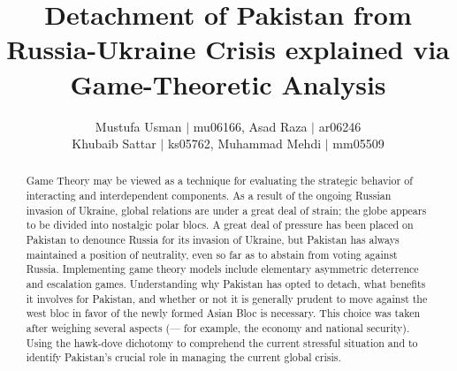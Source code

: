 \documentclass[runningheads]{llncs}
\begin{document}
%
\title{Detachment of Pakistan from Russia-Ukraine Crisis explained via Game-Theoretic Analysis}
%
%
\author{Mustufa Usman $|$ mu06166, Asad Raza $|$ ar06246 \\
Khubaib Sattar $|$ ks05762, Muhammad Mehdi $|$ mm05509}


%
\maketitle             %
%
\begin{abstract}
Game Theory may be viewed as a technique for evaluating the strategic behavior of interacting and interdependent components. As a result of the ongoing Russian invasion of Ukraine, global relations are under a great deal of strain; the globe appears to be divided into nostalgic polar blocs. A great deal of pressure has been placed on Pakistan to denounce Russia for its invasion of Ukraine, but Pakistan has always maintained a position of neutrality, even so far as to abstain from voting against Russia. Implementing game theory models include elementary asymmetric deterrence and escalation games. Understanding why Pakistan has opted to detach, what benefits it involves for Pakistan, and whether or not it is generally prudent to move against the west bloc in favor of the newly formed Asian Bloc is necessary. This choice was taken after weighing several aspects (— for example, the economy and national security). Using the hawk-dove dichotomy to comprehend the current stressful situation and to identify Pakistan's crucial role in managing the current global crisis.

\end{abstract}
%
%
%
\end{document}
